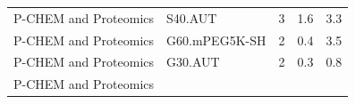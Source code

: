 \documentclass[utf8]{frontiersHLTH} %
\begin{document}
\begin{longtable}[]{@{}lllll@{}}
\begin{minipage}[t]{0.26\columnwidth}
P-CHEM and Proteomics\strut
\end{minipage} & \begin{minipage}[t]{0.21\columnwidth}\raggedright\strut
S40.AUT\strut
\end{minipage} & \begin{minipage}[t]{0.06\columnwidth}\raggedright\strut
3\strut
\end{minipage} & \begin{minipage}[t]{0.15\columnwidth}\raggedright\strut
1.6\strut
\end{minipage} & \begin{minipage}[t]{0.08\columnwidth}\raggedright\strut
3.3\strut
\end{minipage}\tabularnewline
\begin{minipage}[t]{0.26\columnwidth}\raggedright\strut
P-CHEM and Proteomics\strut
\end{minipage} & \begin{minipage}[t]{0.21\columnwidth}\raggedright\strut
G60.mPEG5K-SH\strut
\end{minipage} & \begin{minipage}[t]{0.06\columnwidth}\raggedright\strut
2\strut
\end{minipage} & \begin{minipage}[t]{0.15\columnwidth}\raggedright\strut
0.4\strut
\end{minipage} & \begin{minipage}[t]{0.08\columnwidth}\raggedright\strut
3.5\strut
\end{minipage}\tabularnewline
\begin{minipage}[t]{0.26\columnwidth}\raggedright\strut
P-CHEM and Proteomics\strut
\end{minipage} & \begin{minipage}[t]{0.21\columnwidth}\raggedright\strut
G30.AUT\strut
\end{minipage} & \begin{minipage}[t]{0.06\columnwidth}\raggedright\strut
2\strut
\end{minipage} & \begin{minipage}[t]{0.15\columnwidth}\raggedright\strut
0.3\strut
\end{minipage} & \begin{minipage}[t]{0.08\columnwidth}\raggedright\strut
0.8\strut
\end{minipage}\tabularnewline
\begin{minipage}[t]{0.26\columnwidth}\raggedright\strut
P-CHEM and Proteomics\strut
\end{minipage} & \begin{minipage}[t]{0.21\columnwidth}\raggedright\strut

\end{minipage}
\end{longtable}
\end{document}
